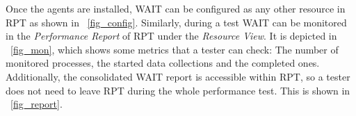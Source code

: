 \documentclass[runningheads,a4paper]{llncs}
\begin{document}
Once the agents are installed, WAIT can be configured as
any other resource in RPT as shown in \figurename ~\ref{fig_config}. Similarly,
during a test WAIT can be monitored in the \emph{Performance Report} of RPT
under the \emph{Resource View}. It is depicted in \figurename ~\ref{fig_mon},
which shows some metrics that a tester can check: The number of monitored
processes, the started data collections and the completed ones.
Additionally, the consolidated WAIT report is accessible within RPT, so a tester
does not need to leave RPT during the whole performance test. This is shown in \figurename ~\ref{fig_report}. 

\vspace{-5pt}
\end{document}
